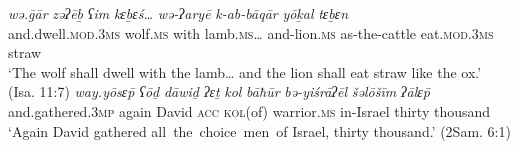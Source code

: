 \documentclass[output=paper]{langsci/langscibook}
\begin{document}
\ea%
    \label{ex:doron:5}
    \gll \textit{wə.ḡār}                        \textit{zəʔēḇ}      \textit{ʕim}  \textit{kɛḇɛś…}       \textit{wə-ʔaryē}        \textit{k-ab-bāqār}   \textit{yōḵal}              \textit{tɛḇɛn}\\
         and.dwell.\textsc{mod.3ms}   wolf.\textsc{ms}  with lamb.\textsc{ms}… and-lion\textsc{.ms}   as-the-cattle  eat.\textsc{mod.3ms}  straw\\
    \glt `The wolf shall dwell with the lamb… and the lion shall eat straw like the ox.' (Isa. 11:7)
\ex%
    \label{ex:doron:6}
    \gll \textit{way.yōsɛ\={p}}              \textit{ʕōḏ}    \textit{dāwiḏ}  \textit{ʔɛṯ}   \textit{kol}        \textit{bāħūr}          \textit{bə-yiśrāʔēl}   \textit{šəlōšīm} \textit{ʔālɛ\={p}}\\
         and.gathered.\textsc{3mp}  again David  \textsc{acc} \textsc{kol}(of) warrior.\textsc{ms} in-Israel      thirty    thousand\\
    \glt `Again David gathered all~the~choice~men~of Israel, thirty thousand.' (2Sam. 6:1)
    \z
\end{document}
